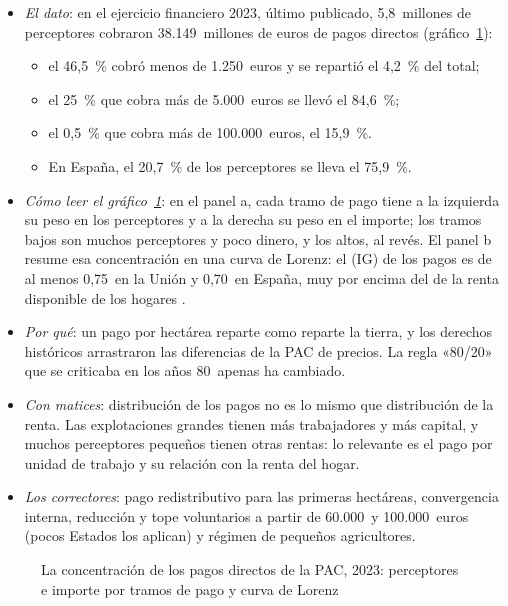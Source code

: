 \documentclass[11pt]{article}
\begin{document}
\begin{itemize}
\item \emph{El dato}: en el ejercicio financiero 2023, último publicado, 5,8~millones de perceptores cobraron 38.149~millones de euros de pagos directos (gráfico~\ref{fig:distribucion})\nocite{CE2025DistribucionPagos}:
  \begin{itemize}
  \item el 46,5~\% cobró menos de 1.250~euros y se repartió el 4,2~\% del total;
  \item el 25~\% que cobra más de 5.000~euros se llevó el 84,6~\%;
  \item el 0,5~\% que cobra más de 100.000~euros, el 15,9~\%.
  \item En España, el 20,7~\% de los perceptores se lleva el 75,9~\%.
  \end{itemize}
\item \emph{Cómo leer el gráfico~\ref{fig:distribucion}}: en el panel a, cada tramo de pago tiene a la izquierda su peso en los perceptores y a la derecha su peso en el importe; los tramos bajos son muchos perceptores y poco dinero, y los altos, al revés. El panel b resume esa concentración en una curva de Lorenz: el  (IG) de los pagos es de al menos 0,75~en la Unión y 0,70~en España, muy por encima del de la renta disponible de los hogares .
\item \emph{Por qué}: un pago por hectárea reparte como reparte la tierra, y los derechos históricos arrastraron las diferencias de la PAC de precios. La regla «80/20» que se criticaba en los años 80~apenas ha cambiado.
\item \emph{Con matices}: distribución de los pagos no es lo mismo que distribución de la renta. Las explotaciones grandes tienen más trabajadores y más capital, y muchos perceptores pequeños tienen otras rentas: lo relevante es el pago por unidad de trabajo y su relación con la renta del hogar.
\item \emph{Los correctores}: pago redistributivo para las primeras hectáreas, convergencia interna, reducción y tope voluntarios a partir de 60.000~y 100.000~euros (pocos Estados los aplican) y régimen de pequeños agricultores.
\end{itemize}

\begin{figure}[H]
\centering
\caption{La concentración de los pagos directos de la PAC, 2023: perceptores e importe por tramos de pago y curva de Lorenz}\label{fig:distribucion}
\end{figure}
\end{document}
